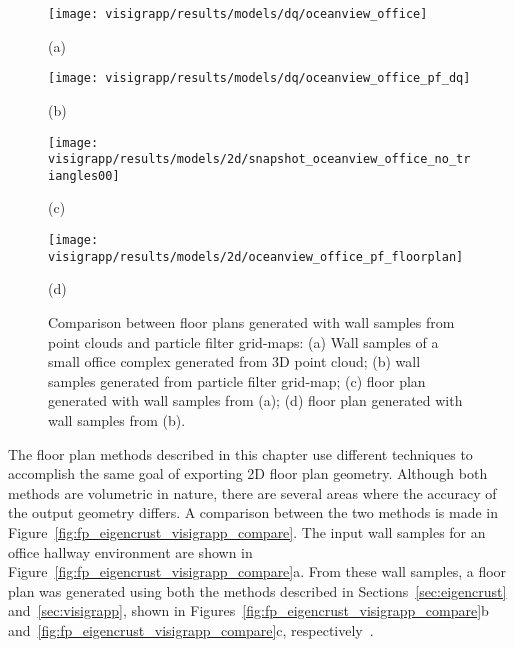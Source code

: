 \documentclass[12pt,onecolumn,oneside]{book}
\begin{document}
\begin{figure}

	\centering
	\begin{minipage}[b]{0.45\linewidth}
	\centerline{\texttt{[image: visigrapp/results/models/dq/oceanview\_office]}}
	\centerline{(a)}
	\end{minipage}
	\hfill
	\begin{minipage}[b]{0.45\linewidth}
	\centerline{\texttt{[image: visigrapp/results/models/dq/oceanview\_office\_pf\_dq]}}
	\centerline{(b)}
	\end{minipage}

	\centering
	\begin{minipage}[b]{0.45\linewidth}
	\centerline{\texttt{[image: visigrapp/results/models/2d/snapshot\_oceanview\_office\_no\_triangles00]}}
	\centerline{(c)}
	\end{minipage}
	\hfill
	\begin{minipage}[b]{0.45\linewidth}
	\centerline{\texttt{[image: visigrapp/results/models/2d/oceanview\_office\_pf\_floorplan]}}
	\centerline{(d)}
	\end{minipage}

	\caption[Comparison between floor plans generated from point clouds and grid-maps.]{Comparison between floor plans generated with wall samples from point clouds and particle filter grid-maps:  (a) Wall samples of a small office complex generated from 3D point cloud; (b) wall samples generated from particle filter grid-map; (c) floor plan generated with wall samples from (a); (d) floor plan generated with wall samples from (b).}
	\label{fig:pf_pc_compare}

\end{figure}

The floor plan methods described in this chapter use different techniques to accomplish the same goal of exporting 2D floor plan geometry.  Although both methods are volumetric in nature, there are several areas where the accuracy of the output geometry differs.  A comparison between the two methods is made in Figure~\ref{fig:fp_eigencrust_visigrapp_compare}.  The input wall samples for an office hallway environment are shown in Figure~\ref{fig:fp_eigencrust_visigrapp_compare}a.  From these wall samples, a floor plan was generated using both the methods described in Sections~\ref{sec:eigencrust} and~\ref{sec:visigrapp}, shown in Figures~\ref{fig:fp_eigencrust_visigrapp_compare}b and~\ref{fig:fp_eigencrust_visigrapp_compare}c, respectively~\cite{Turner12,Turner14}.
\end{document}
